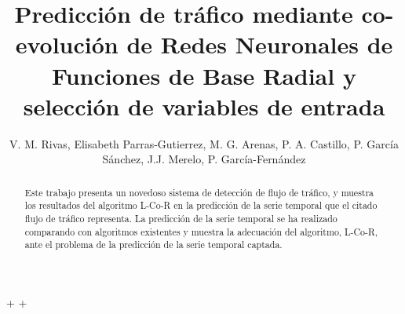 \documentclass[runningheads]{llncs}
\begin{document}
\mainmatter  %



\title{Predicción de tr\'afico mediante co-evolución de Redes Neuronales de Funciones de Base Radial y selección de variables de
entrada }

\author{V. M. Rivas, Elisabeth Parras-Gutierrez, M. G. Arenas, P. A. Castillo, P. García
Sánchez, J.J. Merelo, P. García-Fernández}

%







\maketitle
+\thispagestyle{empty}
+\pagestyle{empty}
\begin{abstract}
Este trabajo presenta un novedoso sistema de detección de flujo de tráfico, y muestra los resultados del algoritmo L-Co-R en la
predicción de la serie temporal que el citado flujo de tráfico representa. La predicción de la serie temporal se ha realizado
comparando con algoritmos existentes y muestra la adecuación del algoritmo, L-Co-R, ante el
problema de la predicción de la serie temporal captada.
\end{abstract}
\end{document}
